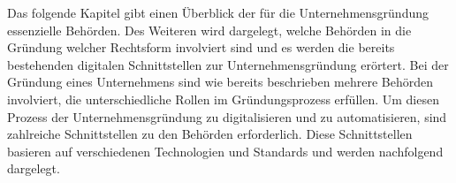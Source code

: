 

Das folgende Kapitel gibt einen Überblick der für die Unternehmensgründung essenzielle Behörden.
Des Weiteren wird dargelegt, welche Behörden in die Gründung welcher Rechtsform involviert sind und  es werden die bereits bestehenden digitalen Schnittstellen zur Unternehmensgründung erörtert.
Bei der Gründung eines Unternehmens sind wie bereits beschrieben mehrere Behörden involviert, die unterschiedliche Rollen im Gründungsprozess erfüllen. 
Um diesen Prozess der Unternehmensgründung zu digitalisieren und zu automatisieren, sind zahlreiche Schnittstellen zu den Behörden erforderlich. 
Diese Schnittstellen basieren auf verschiedenen Technologien und Standards und werden nachfolgend dargelegt.
